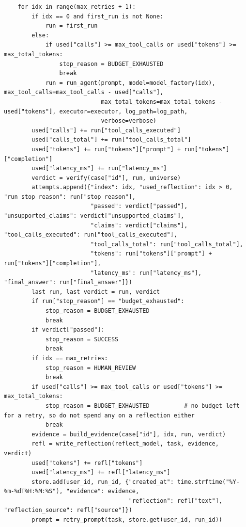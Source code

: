 \documentclass[11pt]{article}
\begin{document}
\begin{lstlisting}
    for idx in range(max_retries + 1):
        if idx == 0 and first_run is not None:
            run = first_run
        else:
            if used["calls"] >= max_tool_calls or used["tokens"] >= max_total_tokens:
                stop_reason = BUDGET_EXHAUSTED
                break
            run = run_agent(prompt, model=model_factory(idx), max_tool_calls=max_tool_calls - used["calls"],
                            max_total_tokens=max_total_tokens - used["tokens"], executor=executor, log_path=log_path,
                            verbose=verbose)
        used["calls"] += run["tool_calls_executed"]
        used["calls_total"] += run["tool_calls_total"]
        used["tokens"] += run["tokens"]["prompt"] + run["tokens"]["completion"]
        used["latency_ms"] += run["latency_ms"]
        verdict = verify(case["id"], run, universe)
        attempts.append({"index": idx, "used_reflection": idx > 0, "run_stop_reason": run["stop_reason"],
                         "passed": verdict["passed"], "unsupported_claims": verdict["unsupported_claims"],
                         "claims": verdict["claims"], "tool_calls_executed": run["tool_calls_executed"],
                         "tool_calls_total": run["tool_calls_total"],
                         "tokens": run["tokens"]["prompt"] + run["tokens"]["completion"],
                         "latency_ms": run["latency_ms"], "final_answer": run["final_answer"]})
        last_run, last_verdict = run, verdict
        if run["stop_reason"] == "budget_exhausted":
            stop_reason = BUDGET_EXHAUSTED
            break
        if verdict["passed"]:
            stop_reason = SUCCESS
            break
        if idx == max_retries:
            stop_reason = HUMAN_REVIEW
            break
        if used["calls"] >= max_tool_calls or used["tokens"] >= max_total_tokens:
            stop_reason = BUDGET_EXHAUSTED          # no budget left for a retry, so do not spend any on a reflection either
            break
        evidence = build_evidence(case["id"], idx, run, verdict)
        refl = write_reflection(reflect_model, task, evidence, verdict)
        used["tokens"] += refl["tokens"]
        used["latency_ms"] += refl["latency_ms"]
        store.add(user_id, run_id, {"created_at": time.strftime("%Y-%m-%dT%H:%M:%S"), "evidence": evidence,
                                    "reflection": refl["text"], "reflection_source": refl["source"]})
        prompt = retry_prompt(task, store.get(user_id, run_id))


\end{lstlisting}
\end{document}
